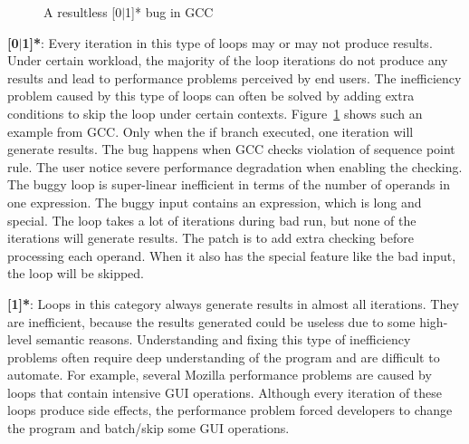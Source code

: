 \begin{figure}[h]
\centering
{}
  \mbox{}
\caption{A resultless [0$|$1]* bug in GCC }
\label{fig:GCC46401}
\end{figure}


{\textbf{[0$|$1]*}}:
Every iteration in this type of loops may or may not produce results.
Under certain workload, the majority of the loop iterations do not produce
any results and lead to performance problems perceived by end users.
The inefficiency problem caused by this type of loops can often be solved
by adding extra conditions to skip the loop under certain contexts.
Figure~\ref{fig:GCC46401} shows such an example from GCC.
Only when the if branch executed,
one iteration will generate results. 
The bug happens when GCC checks violation of sequence point rule. 
The user notice severe performance degradation when enabling the checking. 
The buggy loop is super-linear inefficient in terms of the number of operands
in one expression. The buggy input contains an expression, which is long and special. 
The loop takes a lot of iterations during bad run, but none of the iterations will 
generate results. 
The patch is to add extra checking before processing each operand. When it also has
the special feature like the bad input, the loop will be skipped. 

\comment{
\textcolor{red}{ 
For example, a long expression inside the bug-triggering input exposes the super-linear 
inefficiency of checking violation of sequence point rule for GCC\#46401. 
Each operand on the expression will be compared with all previous operands on the same expression.
When fixing the bug,
developers notice that each operand on the buggy expression has a special feature which make the violation checking never 
report warning (generate results). 
The patch designed by developers is to add an extra condition checking to skip the violation checking for operands with that feature.    
}
}

{\textbf{[1]*}}:
Loops in this category always generate results in almost all iterations. 
They are inefficient, because the results generated could be useless due to
some high-level semantic reasons.
Understanding and fixing this type of inefficiency problems often require
deep understanding of the program and are difficult to automate.
For example, several Mozilla performance problems are caused by 
loops that contain intensive GUI operations.
Although every iteration of these loops produce side effects, 
the performance problem forced developers to change the program 
and batch/skip some GUI operations.

